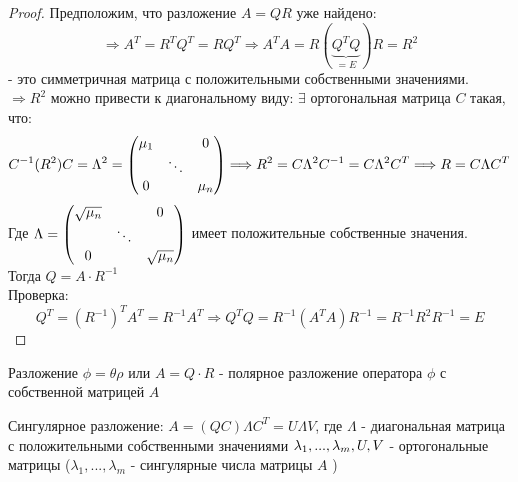 \begin{proof}
    Предположим, что разложение $A = QR$ уже найдено:
    $$\Longrightarrow A^T = R^TQ^T =RQ^T \Longrightarrow A^TA = R(\underbrace{Q^TQ}_{=E})R = R^2$$ 
    - это симметричная матрица с положительными собственными значениями.\\
    $\Longrightarrow R^2$ можно привести к диагональному виду: $\exists$ ортогональная матрица $C$ такая, что:
    $$C^{-1}(R^2)C = \Lambda^2 = \begin{pmatrix}
        \mu_1 & \null & 0\\ \null & \ddots\\ 0 & \null & \mu_n
    \end{pmatrix} \Longrightarrow R^2 = C \Lambda^2C^{-1} = C \Lambda^2 C^T \Longrightarrow R = C \Lambda C^T$$
    Где $\Lambda = \begin{pmatrix}
        \sqrt{\mu_n} & \null & 0\\ \null & \ddots\\ 0 & \null & \sqrt{\mu_n}
    \end{pmatrix}$ имеет положительные собственные значения.\\
    Тогда $Q = A \cdot R^{-1}$ \\
    Проверка: 
    $$Q^T = (R^{-1})^TA^T = R^{-1}A^T \Longrightarrow Q^TQ = R^{-1}(A^TA)R^{-1} = R^{-1}R^2R^{-1} = E$$ 
\end{proof}
\begin{definition}
    Разложение $\phi = \theta \rho$  или $A = Q \cdot R$ - полярное разложение оператора $\phi$ с собственной матрицей $A$
\end{definition}
\begin{definition}
    Сингулярное разложение: $A = (QC) \Lambda C^T = U \Lambda V$, где $\Lambda$ - диагональная матрица с положительными собственными значениями $\lambda_1,...,\lambda_m, \\ U,V$ - ортогональные матрицы ($\lambda_1,...,\lambda_m$ - сингулярные числа матрицы $A$ )
\end{definition} 